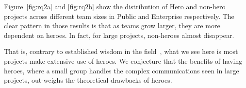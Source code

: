 \documentclass[sigconf]{acmart}
\theoremstyle{break}
\begin{document}
Figure~\ref{fig:rq2a} and \ref{fig:rq2b} show the distribution of Hero and non-hero projects across different team   sizes in Public and Enterprise respectively. The clear pattern in those results is
that as teams grow larger, they are more dependent on heroes. In fact, for large projects,
non-heroes almost disappear.

That is, contrary to established wisdom in the field~\cite{bier2011online},
what we  see here is most
projects make extensive use of heroes.
We conjecture that  the benefits of having heroes, where a small group handles the complex communications seen in large projects, out-weighs the theoretical drawbacks of heroes. 





\end{document}

